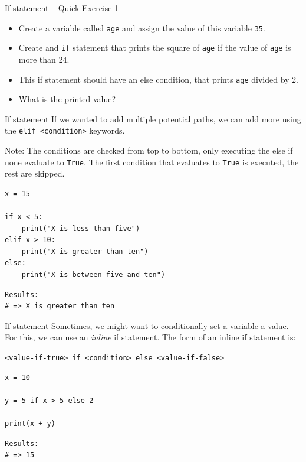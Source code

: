 \documentclass[10pt]{beamer}
\begin{document}
\begin{frame}[label={sec:orgeb58376},fragile]{If statement -- Quick Exercise 1}
 \begin{itemize}
\item Create a variable called \texttt{age} and assign the value of this variable \texttt{35}.
\item Create and \texttt{if} statement that prints the square of \texttt{age} if the value of \texttt{age} is more
than 24.
\item This if statement should have an else condition, that prints \texttt{age} divided by 2.
\item What is the printed value?
\end{itemize}
\end{frame}

\begin{frame}[label={sec:orgbfd1c67},fragile]{If statement}
 If we wanted to add multiple potential paths, we can add more using the \texttt{elif
<condition>} keywords.

Note: The conditions are checked from top to bottom, only executing the else if none
evaluate to \texttt{True}. The first condition that evaluates to \texttt{True} is executed, the rest
are skipped.

\begin{verbatim}
x = 15

if x < 5:
    print("X is less than five")
elif x > 10:
    print("X is greater than ten")
else:
    print("X is between five and ten")
\end{verbatim}

\begin{verbatim}
Results: 
# => X is greater than ten
\end{verbatim}
\end{frame}

\begin{frame}[label={sec:org9dfc90b},fragile]{If statement}
 Sometimes, we might want to conditionally set a variable a value. For this, we can
use an \emph{inline} if statement. The form of an inline if statement is:

\texttt{<value-if-true> if <condition> else <value-if-false>}

\begin{verbatim}
x = 10

y = 5 if x > 5 else 2

print(x + y)
\end{verbatim}

\begin{verbatim}
Results: 
# => 15
\end{verbatim}
\end{frame}
\end{document}
